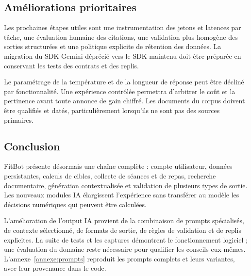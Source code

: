 \documentclass[11pt,a4paper]{article}
\begin{document}
\subsection{Améliorations prioritaires}
Les prochaines étapes utiles sont une instrumentation des jetons et latences par tâche, une évaluation humaine des citations, une validation plus homogène des sorties structurées et une politique explicite de rétention des données. La migration du SDK Gemini déprécié vers le SDK maintenu doit être préparée en conservant les tests des contrats et des replis.

Le paramétrage de la température et de la longueur de réponse peut être décliné par fonctionnalité. Une expérience contrôlée permettra d'arbitrer le coût et la pertinence avant toute annonce de gain chiffré. Les documents du corpus doivent être qualifiés et datés, particulièrement lorsqu'ils ne sont pas des sources primaires.

\subsection{Conclusion}
FitBot présente désormais une chaîne complète : compte utilisateur, données persistantes, calculs de cibles, collecte de séances et de repas, recherche documentaire, génération contextualisée et validation de plusieurs types de sortie. Les nouveaux modules IA élargissent l'expérience sans transférer au modèle les décisions numériques qui peuvent être calculées.

L'amélioration de l'output IA provient de la combinaison de prompts spécialisés, de contexte sélectionné, de formats de sortie, de règles de validation et de replis explicites. La suite de tests et les captures démontrent le fonctionnement logiciel ; une évaluation du domaine reste nécessaire pour qualifier les conseils eux-mêmes. L'annexe~\ref{annexe:prompts} reproduit les prompts complets et leurs variantes, avec leur provenance dans le code.

\clearpage
\end{document}
